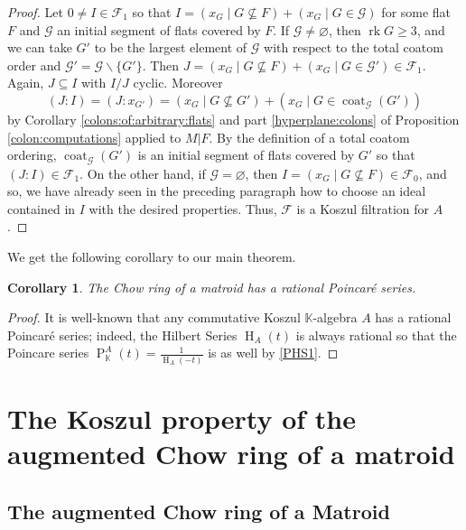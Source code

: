 \documentclass[11pt, reqno]{amsart}
\DeclareMathOperator{\coat}{coat}
\renewcommand{\emptyset}{\varnothing}
\DeclareMathOperator{\HS}{\mathrm{H}}
\newcommand{\kk}{\mathbb{K}}					%
\DeclareMathOperator{\Poin}{P}
\DeclareMathOperator{\rk}{rk}
\renewcommand{\setminus}{\smallsetminus}
\newtheorem{cor}[thm]{Corollary}
\theoremstyle{definition}
\numberwithin{equation}{section}
\numberwithin{table}{section}
\begin{document}
\begin{spacing}{1.1}
\begin{proof}
Let $0 \neq I \in \mathcal{F}_1$ so that $I = (x_G \mid G \nsubseteq F) + (x_G \mid G \in \mathcal{G})$ for some flat $F$ and $\mathcal{G}$ an initial segment of flats covered by $F$.  If $\mathcal{G} \neq \emptyset$, then $\rk G \geq 3$, and we can take $G'$ to be the largest element of $\mathcal{G}$ with respect to the total coatom order and $\mathcal{G}' = \mathcal{G} \setminus \{G'\}$.  Then $J = (x_G \mid G \nsubseteq F) + (x_G \mid G \in \mathcal{G}') \in \mathcal{F}_1$.  Again, $J \subseteq I$ with $I/J$ cyclic.  Moreover
\[ (J : I) = (J : x_{G'}) = (x_G \mid G \nsubseteq G') + (x_G \mid G \in \coat_\mathcal{G}(G')) \]
by Corollary \ref{colons:of:arbitrary:flats} and part \ref{hyperplane:colons} of Proposition \ref{colon:computations} applied to $M\vert F$.  By the definition of a total coatom ordering, $\coat_\mathcal{G}(G')$ is an initial segment of flats covered by $G'$ so that $(J : I) \in \mathcal{F}_1$.  On the other hand, if $\mathcal{G} = \emptyset$, then $I = (x_G \mid G \nsubseteq F) \in \mathcal{F}_0$, and so, we have already seen in the preceding paragraph how to choose an ideal contained in $I$ with the desired properties.  Thus, $\mathcal{F}$ is a Koszul filtration for $A$.
\end{proof}

We get the following corollary to our main theorem.

\begin{cor}
The Chow ring of a matroid has a rational Poincar\'e series.
\end{cor}

\begin{proof}
It is well-known that any commutative Koszul $\kk$-algebra $A$ has a rational Poincar\'e series; indeed, the Hilbert Series $\HS_A(t)$ is always rational so that the Poincare series $\Poin_\kk^A(t) = \frac{1}{\HS_A(-t)}$ is as well by \eqref{PHS1}.
\end{proof}

\section{The Koszul property of the augmented Chow ring of a matroid}\label{Saugmented}

\subsection{The augmented Chow ring of a Matroid}\label{SSaugchow}


\end{spacing}
\end{document}
